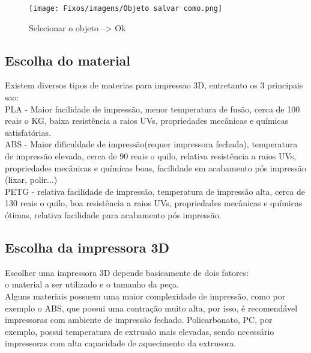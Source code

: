 \begin{figure}[h!]

    \centering

    \texttt{[image: Fixos/imagens/Objeto salvar como.png]}

    \caption{Selecionar o objeto --> Ok}

    \label{fig:my_label}

\end{figure}



\subsection{Escolha do material}

Existem diversos tipos de materias para impressao 3D, entretanto os 3 principais sao:\\[0.4cm]


PLA - Maior facilidade de impressão, menor temperatura de fusão, cerca de 100 reais o KG, baixa resistência a raios UVs, propriedades mecânicas e químicas satisfatórias.\\[0.2cm]



ABS - Maior dificuldade de impressão(requer impressora fechada), temperatura de impressão elevada, cerca de 90 reais o quilo, relativa resistência a raios UVs, propriedades mecânicas e químicas boas, facilidade em acabamento pós impressão (lixar, polir...) \\[0.2cm]



PETG - relativa facilidade de impressão, temperatura de impressão alta, cerca de 130 reais o quilo, boa resistência a raios UVs, propriedades mecânicas e químicas ótimas, relativa facilidade para acabamento pós impressão.\\[0.2cm]

\subsection{Escolha da impressora 3D}



Escolher uma impressora 3D depende basicamente de dois fatores: \\[0.2cm]

o material a ser utilizado e o tamanho da peça. \\[0.2cm]

Alguns materiais possuem uma maior complexidade de impressão, como por exemplo o ABS, que possui uma contração muito alta, por isso, é recomendável impressoras com ambiente de impressão fechado. Policarbonato, PC, por exemplo, possui temperatura de extrusão mais elevadas, sendo necessário impressoras com alta capacidade de aquecimento da extrusora.\\[0.2cm]



